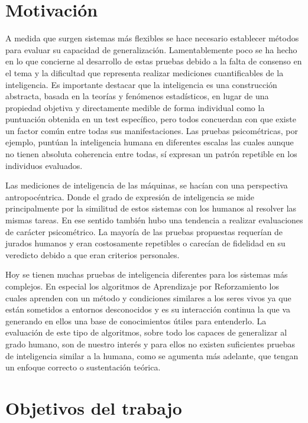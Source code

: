 \section*{Motivación}
A medida que surgen sistemas más flexibles se hace necesario establecer métodos para evaluar su capacidad de generalización. Lamentablemente poco se ha hecho en lo que concierne al desarrollo de estas pruebas debido a la falta de consenso en el tema y la dificultad que representa realizar mediciones cuantificables de la inteligencia. Es importante destacar que la inteligencia es una construcción abstracta, basada en la teorías y fenómenos estadísticos, en lugar de una propiedad objetiva y directamente medible de forma individual como la puntuación obtenida en un test específico, pero todos concuerdan con que existe un factor común entre todas sus manifestaciones. Las pruebas psicométricas, por ejemplo, puntúan la inteligencia humana en diferentes escalas las cuales aunque no tienen absoluta coherencia entre todas, sí expresan un patrón repetible en los individuos evaluados. 

Las mediciones de inteligencia de las máquinas, se hacían con una perspectiva antropocéntrica. Donde el grado de expresión de inteligencia se mide principalmente por la similitud de estos sistemas con los humanos al resolver las mismas tareas. En ese sentido también hubo una tendencia a realizar evaluaciones de carácter psicométrico. La mayoría de las pruebas propuestas requerían de jurados humanos y eran costosamente repetibles o carecían de fidelidad en su veredicto debido a que eran criterios personales.

Hoy se tienen muchas pruebas de inteligencia diferentes para los sistemas más complejos. En especial los algoritmos de Aprendizaje por Reforzamiento los cuales aprenden con un método y condiciones similares a los seres vivos ya que están sometidos a entornos desconocidos y es su interacción continua la que va generando en ellos una base de conocimientos útiles para entenderlo. La evaluación de este tipo de algoritmos, sobre todo los capaces de generalizar al grado humano, son de nuestro interés y para ellos no existen suficientes pruebas de inteligencia similar a la humana, como se agumenta más adelante, que tengan un enfoque correcto o sustentación teórica.

\section*{Objetivos del trabajo}

